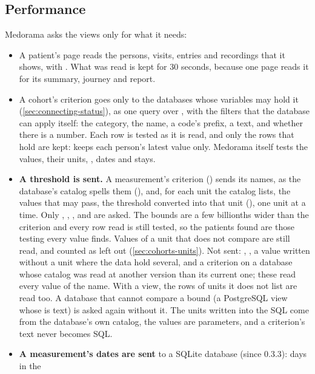 \subsection{Performance}
\label{sec:connecting-performance}

Medorama asks the views only for what it needs:
\begin{itemize}
\item A patient's page reads the persons, visits, entries and recordings that it shows, with
  . What was read is kept for 30 seconds, because one page
  reads it for its summary, journey and report.
\item A cohort's criterion goes only to the databases whose variables may hold it
  (\cref{sec:connecting-status}), as one query over , with the filters that the
  database can apply itself: the category, the name, a code's prefix, a text, and whether there
  is a number. Each row is tested as it is read, and only the rows that hold are kept:
   keeps each person's latest value only. Medorama itself tests the values, their
  units, , dates and stays.
\item \textbf{A threshold is sent.} A measurement's criterion () sends its
  names, as the database's catalog spells them (), and, for each unit the
  catalog lists, the values that may pass, the threshold converted into that unit
  (), one unit at a time. Only
  , , ,  and  are asked. The
  bounds are a few billionths wider than the criterion and every row read is still tested, so
  the patients found are those testing every value finds. Values of a unit that does not compare
  are still read, and counted as left out (\cref{sec:cohorts-units}). Not sent: ,
  \code{!=}, a value written without a unit where the data hold several, and a criterion on a
  database whose catalog was read at another version than its current one; these read every
  value of the name. With a  view, the rows of units it does not list are read
  too. A database that cannot compare a bound (a PostgreSQL view whose  is
  text) is asked again without it. The units written into the SQL come from the database's own
  catalog, the values are parameters, and a criterion's text never becomes SQL.
\item \textbf{A measurement's dates are sent} to a SQLite database (since 0.3.3): days in the

\end{itemize}
